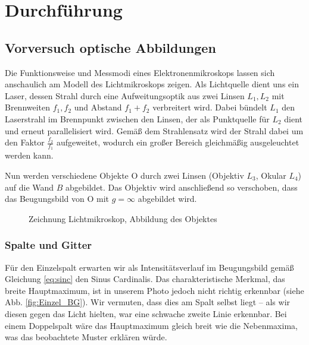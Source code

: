 
\section{Durchführung}

\subsection{Vorversuch optische Abbildungen}
Die Funktionsweise und Messmodi eines Elektronenmikroskops lassen sich anschaulich am Modell des Lichtmikroskops zeigen. Als Lichtquelle dient uns ein Laser, dessen Strahl durch eine Aufweitungsoptik aus zwei Linsen $L_1, L_2$ mit Brennweiten $f_1, f_2$ und Abstand $f_1 + f_2$ verbreitert wird. Dabei bündelt $L_1$ den Laserstrahl im Brennpunkt zwischen den Linsen, der als Punktquelle für $L_2$ dient und erneut parallelisiert wird. Gemäß dem Strahlensatz wird der Strahl dabei um den Faktor $\frac{f_2}{f_1}$ aufgeweitet, wodurch ein großer Bereich gleichmäßig ausgeleuchtet werden kann.

Nun werden verschiedene Objekte O durch zwei Linsen (Objektiv $L_3$, Okular $L_4$) auf die Wand $B$ abgebildet. Das Objektiv wird anschließend so verschoben, dass das Beugungsbild von O mit $g = \infty$ abgebildet wird.

\begin{figure}[h]
	\centering
	\def\svgwidth{0.7\textwidth}
	
	\caption{Zeichnung Lichtmikroskop, Abbildung des Objektes}
	\label{fig:light}
\end{figure}


\subsubsection{Spalte und Gitter}
Für den Einzelspalt erwarten wir als Intensitätsverlauf im Beugungsbild gemäß Gleichung \eqref{eq:sinc} den Sinus Cardinalis. Das charakteristische Merkmal, das breite Hauptmaximum, ist in unserem Photo jedoch nicht richtig erkennbar (siehe Abb. \ref{fig:Einzel_BG}). Wir vermuten, dass dies am Spalt selbst liegt -- als wir diesen gegen das Licht hielten, war eine schwache zweite Linie erkennbar. Bei einem Doppelspalt wäre das Hauptmaximum gleich breit wie die Nebenmaxima, was das beobachtete Muster erklären würde.


